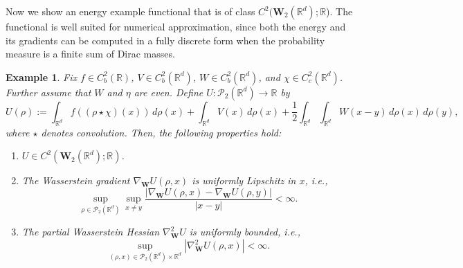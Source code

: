 \documentclass[11pt,a4paper]{amsart}
\newcommand{\1}{\mathds{1}}
\newcommand{\R}{{\mathbb R}}
\newtheorem{example}[theorem]{\textbf{Example}}
\numberwithin{equation}{section}
\begin{document}
Now we show an energy example functional that is of class $C^2(\mathbf{W}_2(\R^d);\R$). The functional is well suited for numerical approximation, since both the energy and its gradients can be computed in a fully discrete form when the probability measure is a finite sum of Dirac masses.

\begin{example} 
Fix $ f \in C_b^2(\mathbb{R}) $, $ V \in C_b^2(\mathbb{R}^d) $, $ W \in C_b^2(\mathbb{R}^d) $, and $ \chi \in C_c^2(\mathbb{R}^d) $. Further assume that $ W $ and $ \eta $ are even. Define $ U : \mathcal{P}_2(\mathbb{R}^d) \to \mathbb{R} $ by  
\[
U(\rho) := \int_{\mathbb{R}^d} f((\rho \star \chi)(x)) \, d\rho(x) + \int_{\mathbb{R}^d} V(x) \, d\rho(x) + \frac{1}{2} \int_{\mathbb{R}^d} \int_{\mathbb{R}^d} W(x-y) \, d\rho(x) \, d\rho(y),
\]
where $ \star $ denotes convolution. Then, the following properties hold:
\begin{enumerate}
    \item $ U \in C^2(\mathbf{W}_2(\mathbb{R}^d); \mathbb{R}) $.
    
    \item The Wasserstein gradient $ \nabla_{\mathbf{W}} U(\rho, x) $ is uniformly Lipschitz in $ x $, i.e.,
    \[
    \sup_{\rho \in \mathcal{P}_2(\mathbb{R}^d)} \sup_{x \neq y} \frac{|\nabla_{\mathbf{W}} U(\rho, x) - \nabla_{\mathbf{W}} U(\rho, y)|}{|x - y|} < \infty.
    \]

    \item The partial Wasserstein Hessian $ \nabla^2_{\mathbf{W}} U $ is uniformly bounded, i.e., 
    \[
    \sup_{(\rho, x) \in \mathcal{P}_2(\mathbb{R}^d) \times \mathbb{R}^d} |\nabla^2_{\mathbf{W}} U(\rho, x)| < \infty.
    \]

\end{enumerate}

\label{C2_functionals}

\end{example}
\end{document}
